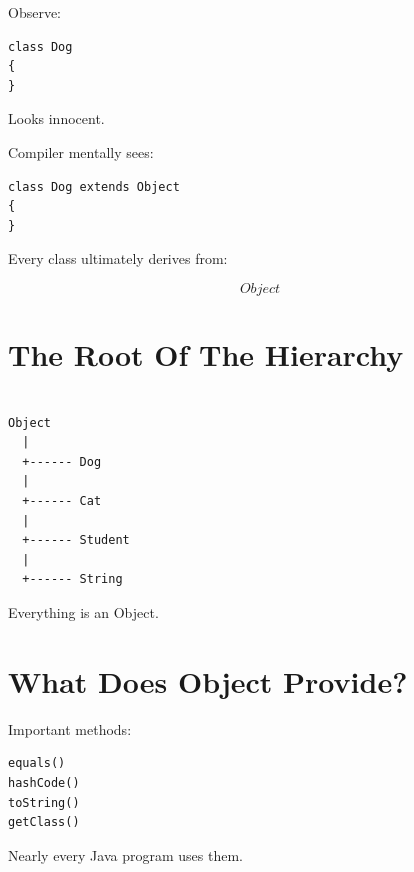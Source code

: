 \documentclass[11pt,a4paper]{book}
\begin{document}
Observe:

\begin{verbatim} 
class Dog
{
}
\end{verbatim}


Looks innocent.


Compiler mentally sees:

\begin{verbatim} 
class Dog extends Object
{
}
\end{verbatim}


Every class ultimately derives from:

\[
Object
\]


\section{The Root Of The Hierarchy}

\begin{verbatim}

Object
  |
  +------ Dog
  |
  +------ Cat
  |
  +------ Student
  |
  +------ String

\end{verbatim}


Everything is an Object.


\section{What Does Object Provide?}

Important methods:

\begin{verbatim}
equals()
hashCode()
toString()
getClass()
\end{verbatim}


Nearly every Java program uses them.

\end{document}
